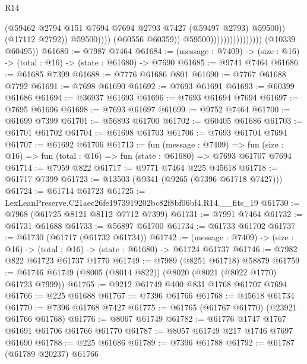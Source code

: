 \begin{lexlean}{R14}
\begin{coremodule}
                                                    (@59462
                                                      @2794
                                                      @151
                                                      @7694
                                                      @7694
                                                      @2793
                                                      @7427
                                                      (@59497 @2793)
                                                      @59500))
                                                  (@17112 @2792))
                                                @59500))))
                                        (@60556 @60359))
                                      @59500))))))))))))))))
      (@10339 @60495))
@61680 := @7987 @7464
@61684 := (message : @7409) -> (size : @16) -> (total : @16) -> (state : @61680) -> @7690
@61685 := @9741 @7464
@61686 := @61685 @7399
@61688 := @7776 @61686 @801
@61690 := @7767 @61688 @7792
@61691 := @7698 @61690
@61692 := @7693 @61691
@61693 := @60399 @61686
@61694 := @36937 @61693
@61696 := @7693 @61694 @7694
@61697 := @7695 @61696
@61698 := @7693 @61697
@61699 := @9752 @7464
@61700 := @61699 @7399
@61701 := @56893 @61700
@61702 := @60405 @61686
@61703 := @61701 @61702
@61704 := @61698 @61703
@61706 := @7693 @61704 @7694
@61707 := @61692 @61706
@61713 := fun (message : @7409) =>
  fun (size : @16) => fun (total : @16) => fun (state : @61680) => @7693 @61707 @7694
@61714 := @7959 @822
@61717 := @9771 @7464 @225 @45618
@61718 := @61717 @7399
@61723 := @13503 (@9341 (@9265 (@7396 @61718 @7427)))
@61724 := @61714 @61723
@61725 := LexLeanPreserve.C21aec26fe1973919202bc82f8bf06bf4.R14.__fits_19
@61730 := @7968 (@61725 @8121 @8112 @7712 @7399)
@61731 := @7991 @7464
@61732 := @61731 @61688
@61733 := @56897 @61700
@61734 := @61733 @61702
@61737 := @61730 (@61717 (@61732 @61734))
@61742 := (message : @7409) -> (size : @16) -> (total : @16) -> (state : @61680) -> @61724 @61737
@61746 := @7982 @822 @61723 @61737 @1770
@61749 := @7989 (@8251 @61718) @58879
@61759 := @61746 @61749 (@8005 (@8014 @822)) (@8020 (@8021 (@8022 @1770) @61723 @7999))
@61765 := @9212 @61749 @400 @831 @1768 @61707 @7694
@61766 := @225 @61688
@61767 := @7396 @61766
@61768 := @45618 @61734
@61770 := @7396 @61768 @7427
@61775 := @61765 (@61767 @61770) (@23921 @61766 @61768)
@61776 := @8067 @61749
@61782 := @61776 @1747 @1767 @61691 @61706 @61766 @61770
@61787 := @8057 @61749 @217 @1746 @7697 @61690
@61788 := @225 @61686
@61789 := @7396 @61788
@61792 := @61787 (@61789 @20237) @61766

\end{coremodule}
\end{lexlean}
